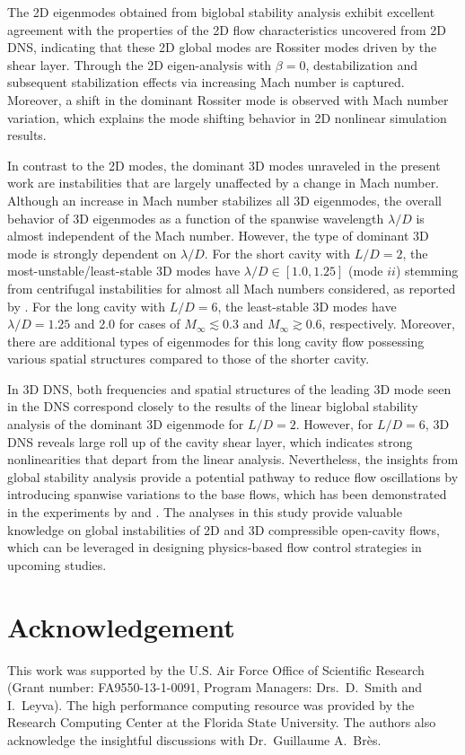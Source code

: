 \documentclass{jfm}
\begin{document}
The 2D eigenmodes obtained from biglobal stability analysis exhibit excellent agreement with the properties of the 2D flow characteristics uncovered from 2D DNS, indicating that these 2D global modes are Rossiter modes driven by the shear layer. Through the 2D eigen-analysis with $\beta=0$, destabilization and subsequent stabilization effects via increasing Mach number is captured. Moreover, a shift in the dominant Rossiter mode is observed with Mach number variation, which explains the mode shifting behavior in 2D nonlinear simulation results.

In contrast to the 2D modes, the dominant 3D modes unraveled in the present work are 
instabilities that are largely unaffected by a change in Mach number. Although an increase in Mach number stabilizes all 3D eigenmodes, the overall behavior of 3D eigenmodes as a function of the spanwise wavelength $\lambda/D$ is almost independent of the Mach number. However, the type of dominant 3D mode is strongly dependent on $\lambda/D$. For the short cavity with $L/D=2$, the most-unstable/least-stable 3D modes have $\lambda/D\in[1.0,1.25]$ (mode $ii$) stemming from centrifugal instabilities for almost all Mach numbers considered, %
as reported by \cite{Bres:JFM08}. For the long cavity with $L/D=6$, the least-stable 3D modes have $\lambda/D=1.25$ and 2.0 for cases of $M_\infty \lesssim 0.3$ and $M_\infty \gtrsim 0.6$, respectively. Moreover, there are additional types of eigenmodes for this long cavity flow possessing various spatial structures compared to those of the shorter cavity. 

In 3D DNS, both frequencies and spatial structures of the leading 3D mode seen in the DNS correspond closely to the results of the linear biglobal stability analysis of the dominant 3D eigenmode for $L/D=2$. However, for $L/D=6$, 3D DNS reveals large roll up of the cavity shear layer, which indicates strong nonlinearities that depart from the linear analysis. Nevertheless, the insights from global stability analysis provide a potential pathway to reduce flow oscillations by introducing spanwise variations to the base flows, which has been demonstrated in the experiments by \cite{Lusk:EF12, Zhang:AIAA15} and \cite{George:AIAA15}. The analyses in this study provide valuable knowledge on global instabilities of 2D and 3D compressible open-cavity flows, which can be leveraged in designing physics-based flow control strategies in upcoming studies.


\section*{Acknowledgement}
This work was supported by the U.S. Air Force Office of Scientific Research (Grant number: FA9550-13-1-0091, Program Managers: Drs.~D.~Smith and I.~Leyva). The high performance computing resource was provided by the Research Computing Center at the Florida State University. The authors also acknowledge the insightful discussions with Dr.~Guillaume A.~Br\`es. 




\end{document}
